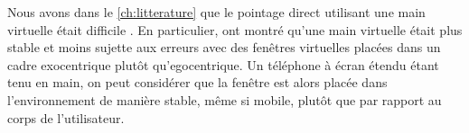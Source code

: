 Nous avons dans le \autoref{ch:litterature} que le pointage direct utilisant une main virtuelle était difficile \citep{Chan2010, Argelaguet2013}. En particulier, \cite{Ens2014} ont montré qu'une main virtuelle était plus stable et moins sujette aux erreurs avec des fenêtres virtuelles placées dans un cadre exocentrique plutôt qu'egocentrique. Un téléphone à écran étendu étant tenu en main, on peut considérer que la fenêtre est alors placée dans l'environnement de manière stable, même si mobile, plutôt que par rapport au corps de l'utilisateur.


